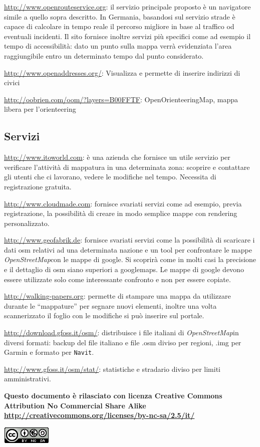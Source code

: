 \documentclass[a4paper,twoside,12pt,]{article}
\newcommand{\osm}{\emph{OpenStreetMap\xspace}}
\begin{document}
\url{http://www.openrouteservice.org}: il servizio principale proposto è un navigatore simile a quello sopra descritto. In Germania, basandosi sul servizio strade è capace di calcolare in tempo reale il percorso migliore in base al traffico od eventuali incidenti. Il sito fornisce inoltre servizi più specifici come ad esempio il tempo di accessibilità: dato un punto sulla mappa verrà evidenziata l'area raggiungibile entro un determinato tempo dal punto considerato.

\url{http://www.openaddresses.org/}: Visualizza e permette di inserire indirizzi di civici

\url{http://oobrien.com/oom/?layers=B00FFTF}: OpenOrienteeringMap, mappa libera per l'orienteering

\subsection{Servizi}

\url{http://www.itoworld.com}: è una azienda che fornisce un utile servizio per verificare l'attività di mappatura in una determinata zona: scoprire  e contattare gli utenti che ci lavorano, vedere le modifiche nel tempo. Necessita di registrazione gratuita.

\url{http://www.cloudmade.com}: fornisce svariati servizi come ad esempio, previa registrazione, la possibilità di creare in modo semplice mappe con rendering personalizzato.

\url{http://www.geofabrik.de}: fornisce svariati servizi come la possibilità di scaricare i dati osm relativi ad una determinata nazione e un tool per confrontare le mappe \osm con le mappe di google. Si scoprirà come in molti casi la precisione e il dettaglio di osm siano superiori a googlemaps. Le mappe di google devono essere utilizzate solo come interessante confronto e non per essere copiate.

\url{http://walking-papers.org}: permette di stampare una mappa da utilizzare durante le ``mappature'' per segnare nuovi elementi, inoltre una volta scannerizzato il foglio con le modifiche si può inserire sul portale.

\url{http://download.gfoss.it/osm/}: distribuisce i file italiani di \osm in diversi formati: backup del file italiano e file .osm diviso per regioni, .img per Garmin e formato per \texttt{Navit}.

\url{http://www.gfoss.it/osm/stat/}: statistiche e stradario diviso per limiti amministrativi.

\newpage
\begin{center}\begin{small}\textbf{
Questo documento è rilasciato con licenza 
Creative Commons Attribution No Commercial Share Alike
\url{http://creativecommons.org/licenses/by-nc-sa/2.5/it/}}\end{small}\end{center}
\begin{center}
 \includegraphics{ccbysa.png}
\end{center}
\end{document}
